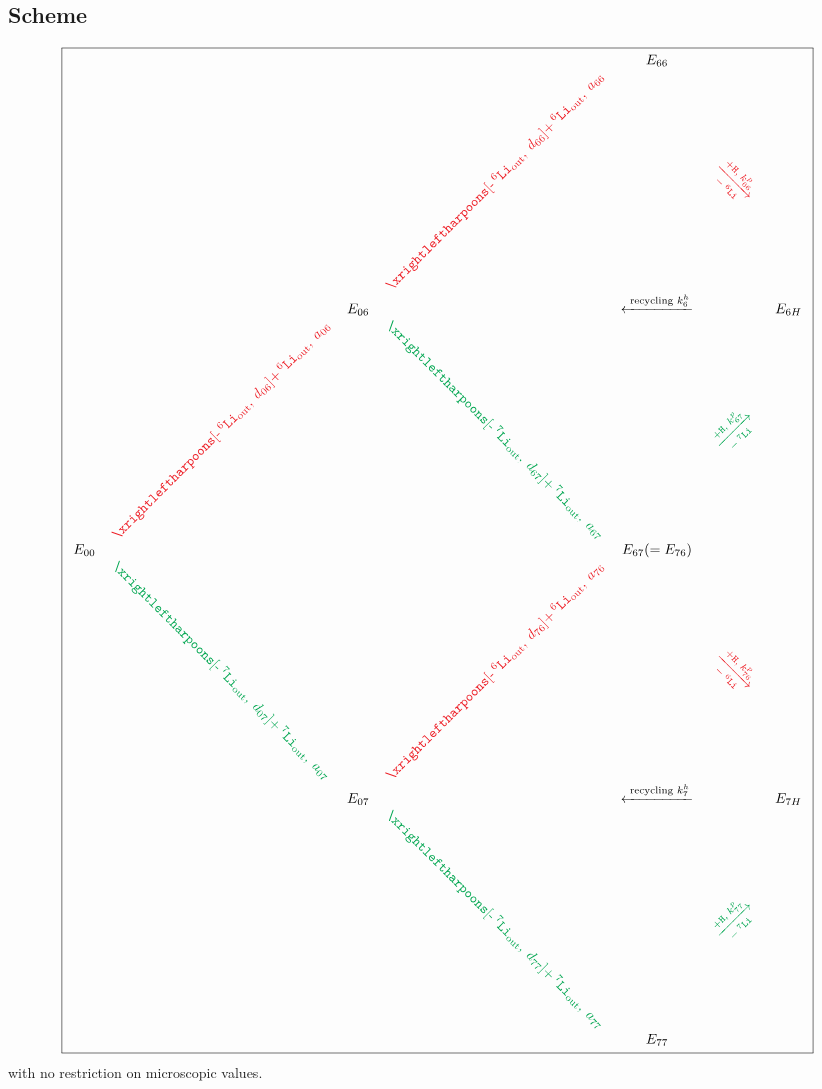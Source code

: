 \documentclass[aps,onecolumn,11pt]{revtex4}
\newcommand{\mychem}[1]{\mathtt{#1}}
\newcommand{\spLi}[1]{{\!~^{#1}\mychem{Li}}}
\newcommand{\spproton}{\mychem{H}}
\newcommand{\myout}[1]{{#1}_{\mathrm{out}}}
\newcommand{\spLiOut}[1]{\myout{\spLi{#1}}}
\newcommand{\myrotate}[2]{\rotatebox[origin=c]{#1}{#2}}
\newcommand{\inpLi}[1]{\text{+}\spLiOut{#1}}
\newcommand{\outLi}[1]{\text{-}\spLiOut{#1}}
\newcommand{\mycolor}[2]{\ifthenelse{\equal{#1}{6}}{{\color{Red}#2}}{{\color{Green}#2}}}
\begin{document}
\subsection{Scheme}
{
\Large
\begin{equation}
\boxed{
\begin{array}{ccccccc}
 & &        &                                                  & E_{66} & & \\
 & &        & \myrotate{45}{\mycolor{6}{$\xrightleftharpoons[\outLi{6},\;d_{66}]{\inpLi{6},\;a_{66}}$}} & &  \myrotate{-45}{\mycolor{6}{$\xrightarrow[-\spLi{6}]{+ \spproton, \; k^p_{66}}$}}& \\
 & & E_{06} &  & \xleftarrow{\text{ recycling } k^h_6 } & & E_{6H}\\
 &  \myrotate{45}{\mycolor{6}{$\xrightleftharpoons[\outLi{6},\;d_{06}]{\inpLi{6},\;a_{06}}$}} &   & \myrotate{-45}{\mycolor{7}{$\xrightleftharpoons[\outLi{7},\;d_{67}]{\inpLi{7},\;a_{67}}$}} & & \myrotate{45}{\mycolor{7}{$\xrightarrow[-\spLi{7}]{+ \spproton, \; k^p_{67}}$}}&\\
E_{00} & &  & & E_{67}(=E_{76}) & & \\ 
  & \myrotate{-45}{\mycolor{7}{$\xrightleftharpoons[\outLi{7},\;d_{07}]{\inpLi{7},\;a_{07}}$}} &  & \myrotate{45}{\mycolor{6}{$\xrightleftharpoons[\outLi{6},\;d_{76}]{\inpLi{6},\;a_{76}}$}} & & \myrotate{-45}{\mycolor{6}{$\xrightarrow[-\spLi{6}]{+ \spproton, \; k^p_{76}}$}} & \\
  & & E_{07} &   & \xleftarrow{\text{ recycling } k^h_7 } & & E_{7H}\\
  & &  & \myrotate{-45}{\mycolor{7}{$\xrightleftharpoons[\outLi{7},\;d_{77}]{\inpLi{7},\;a_{77}}$}} & & \myrotate{45}{\mycolor{7}{$\xrightarrow[-\spLi{7}]{+ \spproton, \; k^p_{77}}$}} &\\
  & &  &  & E_{77} & &\\

 \end{array}
 }
\end{equation}
}
with no restriction on microscopic values.
\end{document}
